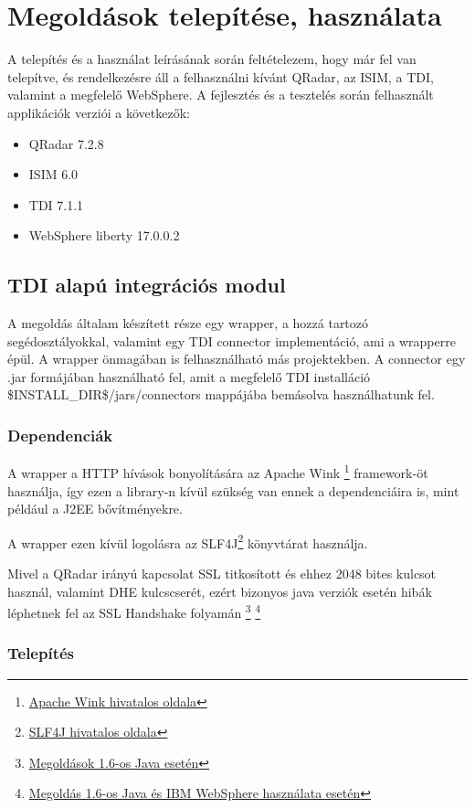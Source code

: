 \chapter{Megoldások telepítése, használata}
A telepítés és a használat leírásának során feltételezem, hogy már fel van telepítve, és rendelkezésre áll a felhasználni kívánt QRadar, az ISIM, a TDI, valamint a megfelelő WebSphere. A fejlesztés és a tesztelés során felhasznált applikációk verziói a következők:

\begin{itemize}
	\item QRadar 7.2.8
	\item ISIM 6.0
	\item TDI 7.1.1
	\item WebSphere liberty 17.0.0.2
\end{itemize}

\section{TDI alapú integrációs modul}
A megoldás általam készített része egy wrapper, a hozzá tartozó segédosztályokkal, valamint egy TDI connector implementáció, ami a wrapperre épül. A wrapper önmagában is felhasználható más projektekben. A connector egy .jar formájában használható fel, amit a megfelelő TDI installáció \$INSTALL\_DIR\$/jars/connectors mappájába bemásolva használhatunk fel. 
\subsection{Dependenciák}
A wrapper a HTTP hívások bonyolítására az Apache Wink \footnote{\href{https://wink.apache.org/}{Apache Wink hivatalos oldala}} framework-öt használja, így ezen a library-n kívül szükség van ennek a dependenciáira is, mint például a J2EE bővítményekre.

A wrapper ezen kívül logolásra az SLF4J\footnote{\href{https://www.slf4j.org/}{SLF4J hivatalos oldala}} könyvtárat használja.

Mivel a QRadar irányú kapcsolat SSL titkosított és ehhez 2048 bites kulcsot használ, valamint DHE kulcscserét, ezért bizonyos java verziók esetén hibák léphetnek fel az SSL Handshake folyamán
\footnote{\href{https://stackoverflow.com/questions/6851461/java-why-does-ssl-handshake-give-could-not-generate-dh-keypair-exception}{Megoldások 1.6-os Java esetén}} \footnote{\href{https://developer.ibm.com/answers/questions/209245/ssl-exception-error-in-wesphere-application-server.html}{Megoldás 1.6-os Java és IBM WebSphere használata esetén}} 
\subsection{Telepítés}
